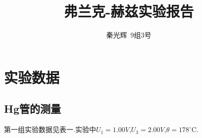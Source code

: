 \documentclass[a4paper,10pt,notitlepage]{article}
\begin{document}
\title{弗兰克-赫兹实验报告}
\author{秦光辉\ 9组3号}
\maketitle

\section{实验数据}

\subsection{Hg管的测量}

	第一组实验数据见表一.实验中$U_1 = 1.00V$,$U_3 = 2.00V$,$\theta = 178^\circ$C.
	
	
\begin{center}


\end{center}
\end{document}
